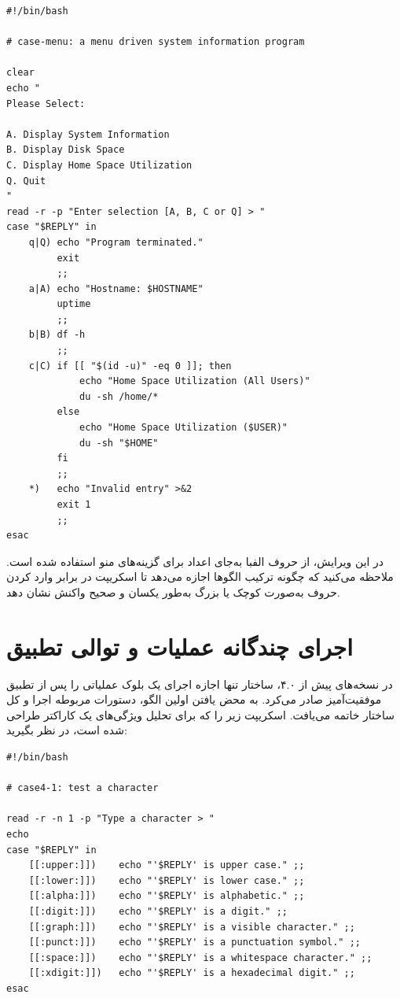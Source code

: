 \begin{latin}
\begin{lstlisting}
#!/bin/bash

# case-menu: a menu driven system information program

clear
echo "
Please Select:

A. Display System Information
B. Display Disk Space
C. Display Home Space Utilization
Q. Quit
"
read -r -p "Enter selection [A, B, C or Q] > "
case "$REPLY" in
    q|Q) echo "Program terminated."
         exit
         ;;
    a|A) echo "Hostname: $HOSTNAME"
         uptime
         ;;
    b|B) df -h
         ;;
    c|C) if [[ "$(id -u)" -eq 0 ]]; then
             echo "Home Space Utilization (All Users)"
             du -sh /home/*
         else
             echo "Home Space Utilization ($USER)"
             du -sh "$HOME"
         fi
         ;;
    *)   echo "Invalid entry" >&2
         exit 1
         ;;
esac
\end{lstlisting}
\end{latin}

در این ویرایش، از حروف الفبا به‌جای اعداد برای گزینه‌های منو استفاده شده است. ملاحظه می‌کنید که چگونه ترکیب الگوها اجازه می‌دهد تا اسکریپت در برابر وارد کردن حروف به‌صورت کوچک یا بزرگ به‌طور یکسان و صحیح واکنش نشان دهد.

\section{اجرای چندگانه عملیات و توالی تطبیق}

در نسخه‌های  پیش از ۴.۰، ساختار  تنها اجازه اجرای یک بلوک عملیاتی را پس از تطبیق موفقیت‌آمیز صادر می‌کرد. به محض یافتن اولین الگو، دستورات مربوطه اجرا و کل ساختار  خاتمه می‌یافت. اسکریپت زیر را که برای تحلیل ویژگی‌های یک کاراکتر طراحی شده است، در نظر بگیرید:

\begin{latin}
\begin{lstlisting}
#!/bin/bash

# case4-1: test a character

read -r -n 1 -p "Type a character > "
echo
case "$REPLY" in
    [[:upper:]])    echo "'$REPLY' is upper case." ;;
    [[:lower:]])    echo "'$REPLY' is lower case." ;;
    [[:alpha:]])    echo "'$REPLY' is alphabetic." ;;
    [[:digit:]])    echo "'$REPLY' is a digit." ;;
    [[:graph:]])    echo "'$REPLY' is a visible character." ;;
    [[:punct:]])    echo "'$REPLY' is a punctuation symbol." ;;
    [[:space:]])    echo "'$REPLY' is a whitespace character." ;;
    [[:xdigit:]])   echo "'$REPLY' is a hexadecimal digit." ;;
esac
\end{lstlisting}
\end{latin}


